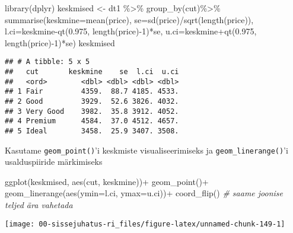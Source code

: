 \documentclass[
]{book}
\newenvironment{Shaded}{\begin{snugshade}}{\end{snugshade}}
\newcommand{\AttributeTok}[1]{\textcolor[rgb]{0.77,0.63,0.00}{#1}}
\newcommand{\CommentTok}[1]{\textcolor[rgb]{0.56,0.35,0.01}{\textit{#1}}}
\newcommand{\DecValTok}[1]{\textcolor[rgb]{0.00,0.00,0.81}{#1}}
\newcommand{\FloatTok}[1]{\textcolor[rgb]{0.00,0.00,0.81}{#1}}
\newcommand{\FunctionTok}[1]{\textcolor[rgb]{0.00,0.00,0.00}{#1}}
\newcommand{\NormalTok}[1]{#1}
\newcommand{\OtherTok}[1]{\textcolor[rgb]{0.56,0.35,0.01}{#1}}
\newcommand{\SpecialCharTok}[1]{\textcolor[rgb]{0.00,0.00,0.00}{#1}}
\begin{document}
\begin{Shaded}
\begin{Highlighting}[]
\FunctionTok{library}\NormalTok{(dplyr)}
\NormalTok{keskmised }\OtherTok{\textless{}{-}}\NormalTok{ dt1 }\SpecialCharTok{\%\textgreater{}\%}
  \FunctionTok{group\_by}\NormalTok{(cut)}\SpecialCharTok{\%\textgreater{}\%}
  \FunctionTok{summarise}\NormalTok{(}\AttributeTok{keskmine=}\FunctionTok{mean}\NormalTok{(price),}
            \AttributeTok{se=}\FunctionTok{sd}\NormalTok{(price)}\SpecialCharTok{/}\FunctionTok{sqrt}\NormalTok{(}\FunctionTok{length}\NormalTok{(price)),}
            \AttributeTok{l.ci=}\NormalTok{keskmine}\SpecialCharTok{{-}}\FunctionTok{qt}\NormalTok{(}\FloatTok{0.975}\NormalTok{, }\FunctionTok{length}\NormalTok{(price)}\SpecialCharTok{{-}}\DecValTok{1}\NormalTok{)}\SpecialCharTok{*}\NormalTok{se,}
            \AttributeTok{u.ci=}\NormalTok{keskmine}\SpecialCharTok{+}\FunctionTok{qt}\NormalTok{(}\FloatTok{0.975}\NormalTok{, }\FunctionTok{length}\NormalTok{(price)}\SpecialCharTok{{-}}\DecValTok{1}\NormalTok{)}\SpecialCharTok{*}\NormalTok{se)}
\NormalTok{keskmised}
\end{Highlighting}
\end{Shaded}

\begin{verbatim}
## # A tibble: 5 x 5
##   cut       keskmine    se  l.ci  u.ci
##   <ord>        <dbl> <dbl> <dbl> <dbl>
## 1 Fair         4359.  88.7 4185. 4533.
## 2 Good         3929.  52.6 3826. 4032.
## 3 Very Good    3982.  35.8 3912. 4052.
## 4 Premium      4584.  37.0 4512. 4657.
## 5 Ideal        3458.  25.9 3407. 3508.
\end{verbatim}

Kasutame \texttt{geom\_point()}'i keskmiste visualiseerimiseks ja \texttt{geom\_linerange()}'i usalduspiiride märkimiseks

\begin{Shaded}
\begin{Highlighting}[]
\FunctionTok{ggplot}\NormalTok{(keskmised, }\FunctionTok{aes}\NormalTok{(cut, keskmine))}\SpecialCharTok{+}
  \FunctionTok{geom\_point}\NormalTok{()}\SpecialCharTok{+}
  \FunctionTok{geom\_linerange}\NormalTok{(}\FunctionTok{aes}\NormalTok{(}\AttributeTok{ymin=}\NormalTok{l.ci, }\AttributeTok{ymax=}\NormalTok{u.ci))}\SpecialCharTok{+}
  \FunctionTok{coord\_flip}\NormalTok{() }\CommentTok{\# saame joonise teljed ära vahetada}
\end{Highlighting}
\end{Shaded}

\begin{center}\texttt{[image: 00-sissejuhatus-ri\_files/figure-latex/unnamed-chunk-149-1]} \end{center}
\end{document}
